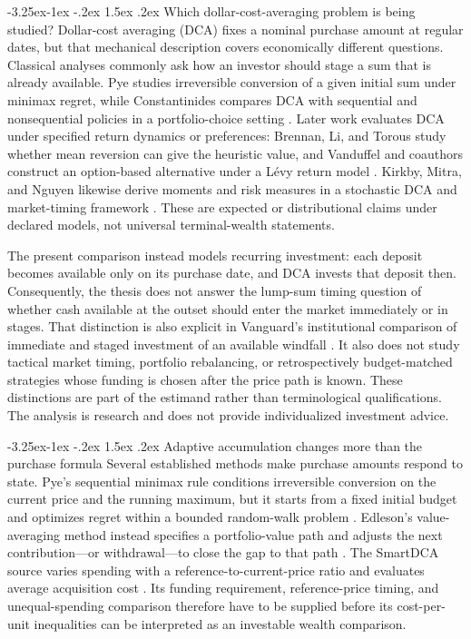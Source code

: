 \documentclass[12pt,a4paper,oneside]{report}
\makeatletter
\renewcommand\subsection{\@startsection{subsection}{2}{\z@}%
  {-3.25ex\@plus -1ex \@minus -.2ex}%
  {1.5ex \@plus .2ex}%
  {\normalfont\fontsize{12}{15}\selectfont\bfseries}}
\makeatother
\begin{document}
\subsection{Which dollar-cost-averaging problem is being studied?}
\label{sec:lit-dca-scope}
Dollar-cost averaging (DCA) fixes a nominal purchase amount at regular dates,
but that mechanical description covers economically different questions.
Classical analyses commonly ask how an investor should stage a sum that is
already available. Pye studies irreversible conversion of a given initial sum
under minimax regret, while Constantinides compares DCA with sequential and
nonsequential policies in a portfolio-choice setting
\citep{pye1971,constantinides1979}. Later work evaluates DCA under specified
return dynamics or preferences: Brennan, Li, and Torous study whether mean
reversion can give the heuristic value, and Vanduffel and coauthors construct
an option-based alternative under a L\'evy return model
\citep{brennan2005,vanduffel2012}. Kirkby, Mitra, and Nguyen likewise derive
moments and risk measures in a stochastic DCA and market-timing framework
\citep{kirkby2020}. These are expected or distributional claims under declared
models, not universal terminal-wealth statements.

The present comparison instead models recurring investment: each deposit
becomes available only on its purchase date, and DCA invests that deposit then.
Consequently, the thesis does not answer the lump-sum timing question of whether
cash available at the outset should enter the market immediately or in stages.
That distinction is also explicit in Vanguard's institutional comparison of
immediate and staged investment of an available windfall \citep{finlayzorn2023}.
It also does not study tactical market timing, portfolio rebalancing, or
retrospectively budget-matched strategies whose funding is chosen after the
price path is known. These distinctions are part of the estimand rather than
terminological qualifications. The analysis is research and does not provide
individualized investment advice.

\subsection{Adaptive accumulation changes more than the purchase formula}
\label{sec:lit-adaptive-accumulation}
Several established methods make purchase amounts respond to state. Pye's
sequential minimax rule conditions irreversible conversion on the current
price and the running maximum, but it starts from a fixed initial budget and
optimizes regret within a bounded random-walk problem \citep{pye1971}.
Edleson's value-averaging method instead specifies a portfolio-value path and
adjusts the next contribution---or withdrawal---to close the gap to that path
\citep{edleson2006}. The SmartDCA source varies spending with a
reference-to-current-price ratio and evaluates average acquisition cost
\citep{calvet2023smartdca}. Its funding requirement, reference-price timing,
and unequal-spending comparison therefore have to be supplied before its
cost-per-unit inequalities can be interpreted as an investable wealth
comparison.
\end{document}
